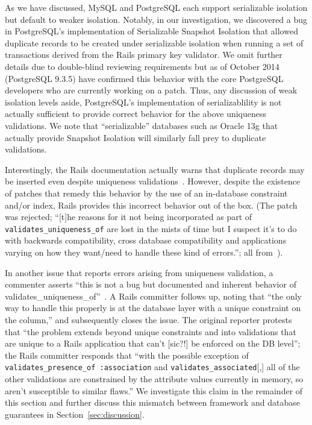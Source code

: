 As we have discussed, MySQL and PostgreSQL each support serializable
isolation but default to weaker isolation. Notably, in our
investigation, we discovered a bug in PostgreSQL's implementation of
Serializable Snapshot Isolation that allowed duplicate records to be
created under serializable isolation when running a set of
transactions derived from the Rails primary key validator. We omit
further details due to double-blind reviewing requirements but as of
October 2014 (PostgreSQL 9.3.5) have confirmed this behavior with the
core PostgreSQL developers who are currently working on a patch. Thus,
any discussion of weak isolation levels aside, PostgreSQL's
implementation of serializablility is not actually sufficient to
provide correct behavior for the above uniqueness validations. We note
that ``serializable'' databases such as Oracle 13g that actually
provide Snapshot Isolation will similarly fall prey to duplicate
validations.

Interestingly, the Rails documentation actually warns that duplicate
records may be inserted even despite uniqueness
validations~\cite{rails-guide}. However, despite the existence of
patches that remedy this behavior by the use of an in-database
constraint and/or index, Rails provides this incorrect behavior out of
the box. (The patch was rejected; ``[t]he reasons for it not being
incorporated as part of \texttt{validates\_uniqueness\_of} are lost in
the mists of time but I suspect it's to do with backwards
compatibility, cross database compatibility and applications varying
on how they want/need to handle these kind of errors.''; all
from~\cite{code-index-patch}).

In another issue that reports errors arising from uniqueness
validation, a commenter asserts ``this is not a bug but documented and
inherent behavior of
validates\_uniqueness\_of''~\cite{code-index-error}.  A Rails
committer follows up, noting that ``the only way to handle this
properly is at the database layer with a unique constraint on the
column,'' and subsequently closes the issue. The original reporter
protests that ``the problem extends beyond unique constraints and into
validations that are unique to a Rails application that can't [sic?!] be
enforced on the DB level''; the Rails committer responds that ``with
the possible exception of \texttt{validates\_presence\_of
  :association} and \texttt{validates\_associated}[,] all of the other
validations are constrained by the attribute values currently in
memory, so aren't susceptible to similar flaws.'' We investigate this
claim in the remainder of this section and further discuss this
mismatch between framework and database guarantees in
Section~\ref{sec:discussion}.

